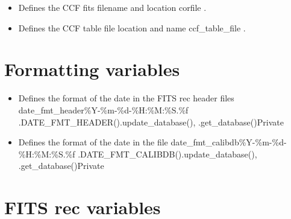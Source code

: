 \begin{itemize}
	\item {} 
	{Defines the CCF fits filename and location}
	{corfile}
	{\calCCF}{\spirouConst.}{\calCCF}
\end{itemize}

\begin{itemize}
	\item {} 
	{Defines the CCF table file location and name}
	{ccf\_table\_file}
	{\calCCF}{\spirouConst.}{\calCCF}
\end{itemize}


\fi

\ifdevguide
\clearpage
\newpage
\section{Formatting variables}
\label{ch:variables:formatting}

\begin{itemize}

\item {}
{Defines the format of the date in the FITS rec header files}
{date\_fmt\_header}{\%Y-\%m-\%d-\%H:\%M:\%S.\%f}
{\spirouCDB}{\spirouConst.DATE\_FMT\_HEADER()}{\spirouCDB.update\_database(), \spirouCDB.get\_database()}{Private}


\item {}
{Defines the format of the date in the \calibdb file}
{date\_fmt\_calibdb}{\%Y-\%m-\%d-\%H:\%M:\%S.\%f}
{\spirouCDB}{\spirouConst.DATE\_FMT\_CALIBDB()}{\spirouCDB.update\_database(), \spirouCDB.get\_database()}{Private}

\end{itemize}

\fi







\ifdevguide
\clearpage
\newpage
\section{FITS rec variables}
\label{ch:variables:fitsrec}

